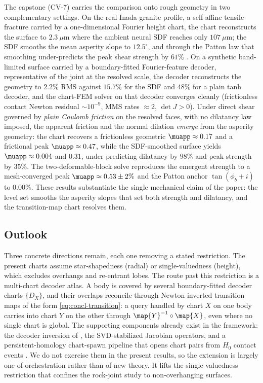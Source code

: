 The capstone (CV-7) carries the comparison onto rough geometry in two complementary settings. On the
real Inada-granite profile, a self-affine tensile fracture \citep{inada2020digitalrocks} carried by a
one-dimensional Fourier height chart, the chart reconstructs the surface to $2.3~\mu$m where the ambient
neural SDF reaches only $107~\mu$m; the SDF smooths the mean asperity slope to $12.5^\circ$, and through
the Patton law that smoothing under-predicts the peak shear strength by $61\%$
\citep{patton1966multiple,barton1977shear}. On a synthetic band-limited surface carried by a
boundary-fitted Fourier-feature decoder, representative of the joint at the resolved scale, the decoder
reconstructs the geometry to $2.2\%$ RMS against $15.7\%$ for the SDF and $48\%$ for a plain tanh
decoder, and the chart-FEM solver on that decoder converges cleanly (frictionless contact Newton residual
$\sim10^{-9}$, MMS rates $\approx 2$, $\det J>0$). Under direct shear governed by \emph{plain Coulomb
friction} on the resolved faces, with no dilatancy law imposed, the apparent friction and the normal
dilation \emph{emerge} from the asperity geometry: the chart recovers a frictionless geometric
$\muapp\approx0.17$ and a frictional peak $\muapp\approx0.47$, while the SDF-smoothed surface yields
$\muapp\approx0.004$ and $0.31$, under-predicting dilatancy by $98\%$ and peak strength by $35\%$. The
two-deformable-block solve reproduces the
emergent strength to a mesh-converged peak $\muapp\approx0.53\pm2\%$ and the Patton anchor
$\tan(\phi_b{+}i)$ to $0.00\%$. These results substantiate the single mechanical claim of the
paper: the level set smooths the asperity slopes that set both strength and dilatancy, and the
transition-map chart resolves them.

\subsection{Outlook}\label{sec:concl-outlook}

Three concrete directions remain, each one removing a stated restriction. The present charts
assume star-shapedness (radial) or single-valuedness (height), which excludes overhangs and
re-entrant lobes. The route past this restriction is a multi-chart decoder atlas. A body is
covered by several boundary-fitted decoder charts $\{D_X\}$, and their overlaps reconcile
through Newton-inverted transition maps of the form \eqref{eq:concl-transition}: a query handled
by chart $X$ on one body carries into chart $Y$ on the other through $\map{Y}^{-1}\circ\map{X}$,
even where no single chart is global. The supporting components already exist in the framework:
the decoder inversion of , the SVD-stabilized Jacobian operators, and a
persistent-homology chart-spawn pipeline that opens chart pairs from $H_0$ contact events
\citep{cohensteiner2007stability,liu2020implicit}. We do not exercise them in the present
results, so the extension is largely one of orchestration rather than of new theory. It
lifts the single-valuedness restriction that confines the rock-joint study to non-overhanging
surfaces.

